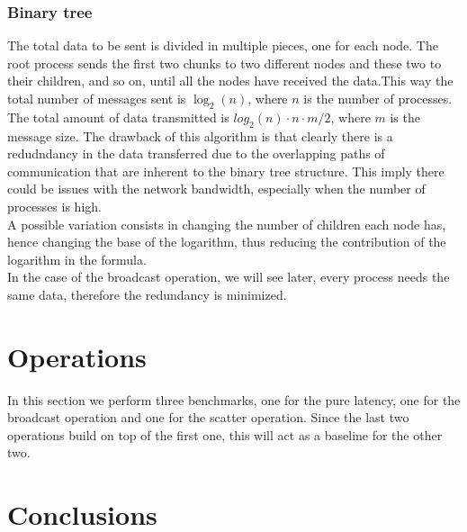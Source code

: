 \subsubsection{Binary tree}
    The total data to be sent is divided in multiple pieces, one
    for each node. The root process sends the first two chunks to
    two different nodes and these two to their children, and so on,
    until all the nodes have received the data.This way the total number
    of messages sent is $\log_2(n)$, where $n$ is the number of processes.
    The total amount of data transmitted is $log_2(n) \cdot n \cdot m/2$,
    where $m$ is the message size. The drawback of this algorithm is that clearly
    there is a redudndancy in the data transferred due to the
    overlapping paths of communication that are inherent to the binary
    tree structure. This imply there could be issues with the network
    bandwidth, especially when the number of processes is high. \\
    A possible variation consists in changing the number of children each
    node has, hence changing the base of the logarithm, thus reducing
    the contribution of the logarithm in the formula.
    \\
    In the case of the broadcast operation, we will see later,
    every process needs the same data, therefore the redundancy
    is minimized.

\section{Operations}
    In this section we perform three benchmarks, one for the pure
    latency, one for the broadcast operation and one for the scatter
    operation. Since the last two operations build on top of the
    first one, this will act as a baseline for the other two.




    




\section{Conclusions}



